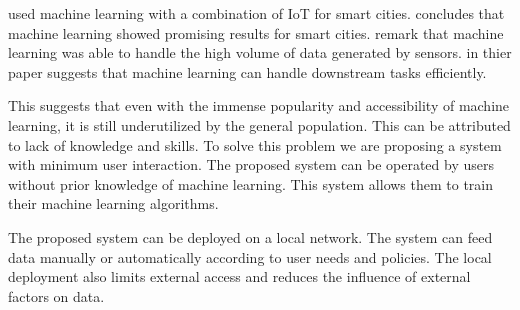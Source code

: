 \cite*{ref_paper_29} used machine learning with a combination of IoT for smart cities. \citeauthor{ref_paper_29} concludes that machine learning showed promising results for smart cities. \citeauthor{ref_paper_29} remark that machine learning was able to handle the high volume of data generated by sensors. \cite*{ref_paper_12} in thier paper suggests that machine learning can handle downstream tasks efficiently.

This suggests that even with the immense popularity and accessibility of machine learning, it is still underutilized by the general population. This can be attributed to lack of knowledge and skills. To solve this problem we are proposing a system with minimum user interaction. The proposed system can be operated by users without prior knowledge of machine learning. This system allows them to train their machine learning algorithms.

The proposed system can be deployed on a local network. The system can feed data manually or automatically according to user needs and policies. The local deployment also limits external access and reduces the influence of external factors on data.

